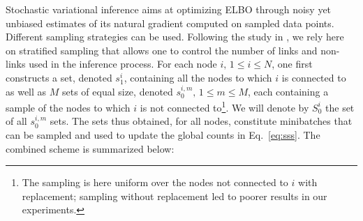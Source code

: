 Stochastic variational inference aims at optimizing ELBO through noisy yet unbiased estimates of its natural gradient computed on sampled data points. Different sampling strategies \cite{gopalan2013efficient,kim2013efficient} can be used. Following the study in \cite{gopalan2013efficient}, we rely here on stratified sampling that allows one to control the number of links and non-links used in the inference process. For each node $i, \, 1 \le i \le N$, one first constructs a set, denoted $s_1^i$, containing all the nodes to which $i$ is connected to as well as $M$ sets of equal size, denoted $s_0^{i,m}, \, 1 \le m \le M$, each containing a sample of the nodes to which $i$ is not connected to\footnote{The sampling is here uniform over the nodes not connected to $i$ with replacement; sampling without replacement led to poorer results in our experiments.}. We will denote by $S_0^i$ the set of all $s_0^{i,m}$ sets. The sets thus obtained, for all nodes, constitute minibatches that can be sampled and used to update the global counts in Eq.~\ref{eq:sss}. The combined scheme is summarized below:
%
